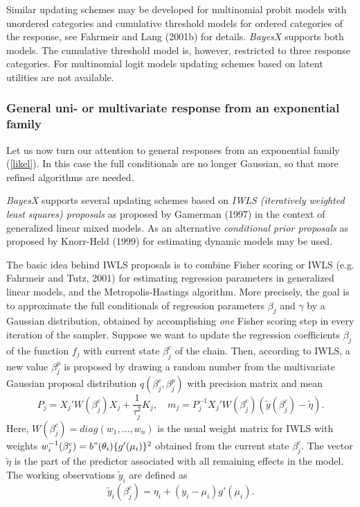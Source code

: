 \documentclass[11pt,a4paper,twoside]{bayesxarticle}
\begin{document}
Similar updating schemes may be developed for multinomial probit
models with unordered categories and cumulative threshold models
for ordered categories of the response, see Fahrmeir and Lang
(2001b) for details. {\em BayesX} supports both models. The
cumulative threshold model is, however, restricted to three
response categories. For multinomial logit models updating schemes
based on latent utilities are not available.

\subsubsection{General uni- or multivariate response from an exponential family}
\label{IWLS}

Let us now turn our attention to general responses from an
exponential family (\ref{likel}). In this case the full
conditionals are no longer Gaussian, so that more refined
algorithms are needed.

{\em BayesX} supports several updating schemes based on {\em IWLS
(iteratively weighted least squares) proposals} as proposed by
Gamerman (1997) in the context of generalized linear mixed models.
As an alternative {\em conditional prior proposals} as proposed by
Knorr-Held (1999) for estimating dynamic models may be used.


The basic idea behind IWLS proposals is to combine Fisher scoring
or IWLS (e.g. Fahrmeir and Tutz, 2001) for estimating regression
parameters in generalized linear models, and the
Metropolis-Hastings algorithm. More precisely, the goal is to
approximate the full conditionals of regression parameters
$\beta_j$ and $\gamma$ by a Gaussian distribution, obtained by
accomplishing {\em one} Fisher scoring step in every iteration of
the sampler. Suppose we want to update the regression coefficients
$\beta_j$ of the  function $f_j$ with current state $\beta_j^c$ of
the chain. Then, according to IWLS, a new value $\beta_j^p$ is
proposed by drawing a random number from the multivariate Gaussian
proposal distribution $q(\beta_j^c,\beta_j^p)$ with precision
matrix and mean
\begin{equation}
\label{prec} P_j = X_j'W(\beta^c_j)X_j + \frac{1}{\tau^2_j}K_j,
\quad m_j = P_j^{-1}X_j'W(\beta^c_j)(\tilde{y}(\beta^c_j) -
\tilde{\eta}).
\end{equation}
Here, $W(\beta^c_j) = diag(w_1,\dots,w_n)$ is the usual weight
matrix for IWLS with weights $w^{-1}_i(\beta^c_j) =
b"(\theta_i)\{g'(\mu_i)\}^2$ obtained from the current state
$\beta^c_j$. The vector $\tilde{\eta}$ is the part of the
predictor associated with all remaining effects in the model. The
working observations $\tilde{y}_i$ are defined as
$$\tilde{y}_i(\beta^c_j) = \eta_i + (y_i - \mu_i)g'(\mu_i).$$
\end{document}
